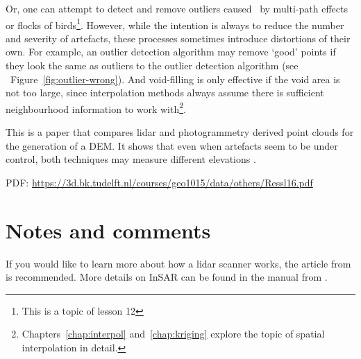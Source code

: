 Or, one can attempt to detect and remove outliers caused \eg\  by multi-path effects or flocks of birds\footnote{This is a topic of lesson 12}. 
However, while the intention is always to reduce the number and severity of artefacts, these processes sometimes introduce distortions of their own.
For example, an outlier detection algorithm may remove `good' points if they look the same as outliers to the outlier detection algorithm (see \eg\ Figure~\ref{fig:outlier-wrong}).
And void-filling is only effective if the void area is not too large, since interpolation methods always assume there is sufficient neighbourhood information to work with\footnote{Chapters~\ref{chap:interpol} and~\ref{chap:kriging} explore the topic of spatial interpolation in detail.}.


\begin{link-box}
This is a paper that compares lidar and photogrammetry derived point clouds for the generation of a DEM\@. It shows that even when artefacts seem to be under control, both techniques may measure different elevations \citep{Ressl16}. 

PDF: \url{https://3d.bk.tudelft.nl/courses/geo1015/data/others/Ressl16.pdf}
\end{link-box}







%
\section{Notes and comments}
If you would like to learn more about how a lidar scanner works, the article from \citet{Wehr99} is recommended.
More details on InSAR can be found in the manual from \citet{ESA07}.

